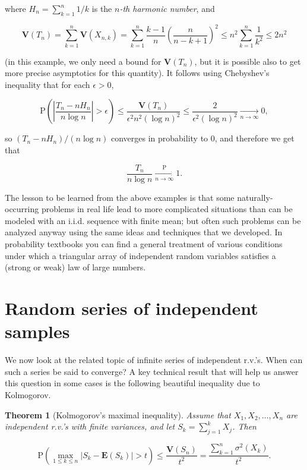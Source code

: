 \documentclass[11pt]{report}
\theoremstyle{plain}
\newtheorem{thm}{Theorem}[chapter]
\theoremstyle{definition}
\begin{document}
\noindent where $H_n = \sum_{k=1}^n 1/k$ is the \emph{$n$-th
harmonic number}, and

\[
\mathbf{V}(T_n) = \sum_{k=1}^n \mathbf{V}(X_{n,k}) =
\sum_{k=1}^n \frac{k-1}{n}\left(\frac{n}{n-k+1}\right)^2 \le n^2 \sum_{k=1}^n \frac{1}{k^2} \le 2 n^2
\]

\noindent (in this example, we only need a bound for
$\mathbf{V}(T_n)$, but it is possible also to get
more precise asymptotics for this quantity). It
follows using Chebyshev's inequality that for each
$\epsilon>0$,

\[
\mathrm{P}\left( \left|\frac{T_n-n H_n}{n \log n} \right| > \epsilon\right) \le \frac{\mathbf{V}(T_n)}{\epsilon^2 n^2 (\log n)^2}
\le \frac{2}{\epsilon^2 (\log n)^2} \xrightarrow[n\to\infty]{} 0,
\]

\noindent so $(T_n-n H_n)/(n\log n)$ converges in probability
to $0$, and therefore we get that

\[
\frac{T_n}{n\log n} \xrightarrow[n\to\infty]{\mathrm{P}} 1.
\]

\noindent The lesson to be learned from the above examples is
that some naturally-occurring problems in real life
lead to more complicated situations than can be
modeled with an i.i.d. sequence with finite mean; but
often such problems can be analyzed anyway using the
same ideas and techniques that we developed. In
probability textbooks you can find a general treatment
of various conditions under which a triangular array
of independent random variables satisfies a (strong or
weak) law of large numbers.

\section{Random series of independent samples}

We now look at the related topic of infinite series
of independent r.v.'s. When can such a series be said
to converge? A key technical result that will help us
answer this question in some cases is the following
beautiful inequality due to Kolmogorov.

\begin{thm}[Kolmogorov's maximal inequality]
Assume that $X_1,X_2,\ldots,X_n$ are independent
r.v.'s with finite variances, and let
$S_k=\sum_{j=1}^k X_j$. Then

\[
\mathrm{P}\left( \max_{1\le k\le n} |S_k-\mathbf{E} (S_k)| > t \right) \le \frac{\mathbf{V}(S_n)}{t^2} = \frac{\sum_{k=1}^n \sigma^2(X_k)}{t^2}.
\]

\end{thm}
\end{document}
